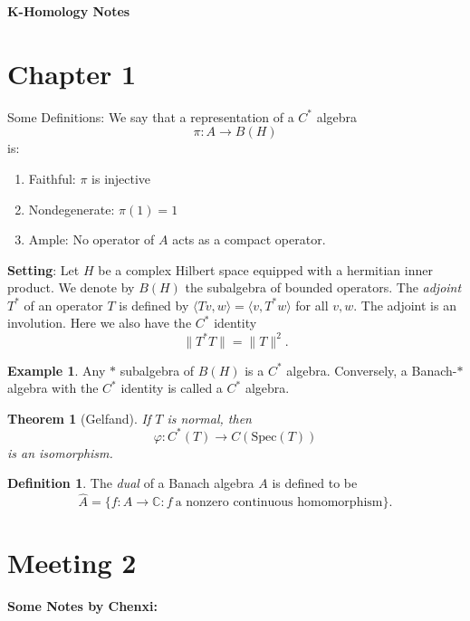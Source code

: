 \documentclass[11pt, reqno]{article}
\theoremstyle{plain}
\newtheorem*{theorem}{Theorem}
\theoremstyle{definition}
\newtheorem*{definition}{Definition}
\newtheorem*{example}{Example}
\theoremstyle{remark}
\renewcommand{\phi}{\varphi}
\newcommand{\CC}{\mathbb{C}}
\begin{document}
\topmargin=-40pt
\renewcommand{\headrulewidth}{1pt}
\renewcommand{\headsep}{20pt}
\thispagestyle{fancy}

{\Huge \bfseries \noindent K-Homology Notes}

\section{Chapter 1}

Some Definitions: We say that a representation of a $C^*$ algebra
\[
    \pi: A \to B(H)
\]
is:
\begin{enumerate}
    \item Faithful: $\pi$ is injective
    \item Nondegenerate: $\pi(1) = 1$
    \item Ample: No operator of $A$ acts as a compact operator.
\end{enumerate}

\textbf{Setting}: Let $H$ be a complex Hilbert space equipped with a hermitian inner 
product. We denote by $B(H)$ the subalgebra of bounded operators. The \textit{adjoint}
$T^*$ of an operator $T$ is defined by $\langle Tv, w\rangle = \langle v, T^* w\rangle$
for all $v, w$. The adjoint is an involution. Here we also have the $C^*$ identity
\[
    \|T^*T\| = \|T\|^2.
\]
\begin{example}
    Any $*$ subalgebra of $B(H)$ is a $C^*$ algebra. Conversely,
    a Banach-$*$ algebra with the $C^*$ identity is called a $C^*$ algebra. 
\end{example}

\begin{theorem}[Gelfand]
    If $T$ is normal, then 
    \[
        \phi: C^*(T) \to C(\text{Spec}(T))
    \]
    is an isomorphism.
\end{theorem}

\begin{definition}
    The \textit{dual} of a Banach algebra $A$ is defined to be 
    \[
        \hat{A} = \{f: A \to \CC: f\ \text{a nonzero continuous homomorphism}\}.
    \]
\end{definition}

\section{Meeting 2}

\textbf{Some Notes by Chenxi:}
\end{document}

